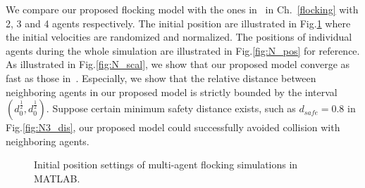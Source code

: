 We compare our proposed flocking model with the ones in~\cite{Vicsek1995,CuckerSmale2007,CuckerDong2010} in Ch.~\ref{flocking} with 2, 3 and 4 agents respectively. The initial position are illustrated in Fig.\ref{fig:simulate_flocking} where the initial velocities are randomized and normalized. The positions of individual agents during the whole simulation are illustrated in Fig.\ref{fig:N_pos} for reference. As illustrated in Fig.\ref{fig:N_scal}, we show that our proposed model converge as fast as those in~\cite{Vicsek1995,CuckerSmale2007,CuckerDong2010}. Especially, we show that the relative distance between neighboring agents in our proposed model is strictly bounded by the interval $(d_0^{\frac{1}{2}}, d_0^{\frac{1}{2}})$. Suppose certain minimum safety distance exists, such as $d_{safe}=0.8$ in Fig.\ref{fig:N3_dis}, our proposed model could successfully avoided collision with neighboring agents. 

\begin{figure}[H]
  \centering
  \caption{Initial position settings of multi-agent flocking simulations in MATLAB.}\label{fig:simulate_flocking}
\end{figure}

